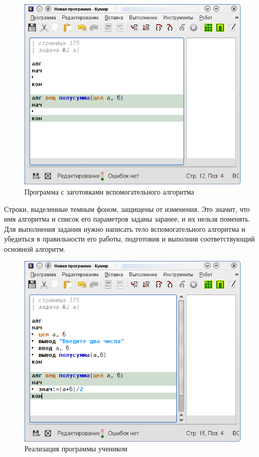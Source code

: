 \begin{figure}[htb]
\begin{center}
\includegraphics[scale=1]{ctrl_t_figure1.png}
\caption{Программа с заготовками вспомогательного алгоритма}
\end{center}
\end{figure}

Строки, выделенные темным фоном, защищены от изменения. Это значит, что имя алгоритма и список его параметров заданы заранее, и их нельзя поменять.
Для выполнения задания нужно написать тело вспомогательного алгоритма и убедиться в правильности его работы, подготовив и выполнив соответствующий основной алгоритм.

\begin{figure}[htb]
\begin{center}
\includegraphics[scale=1]{ctrl_t_figure2.png}
\caption{Реализация программы учеником}
\end{center}
\end{figure}

